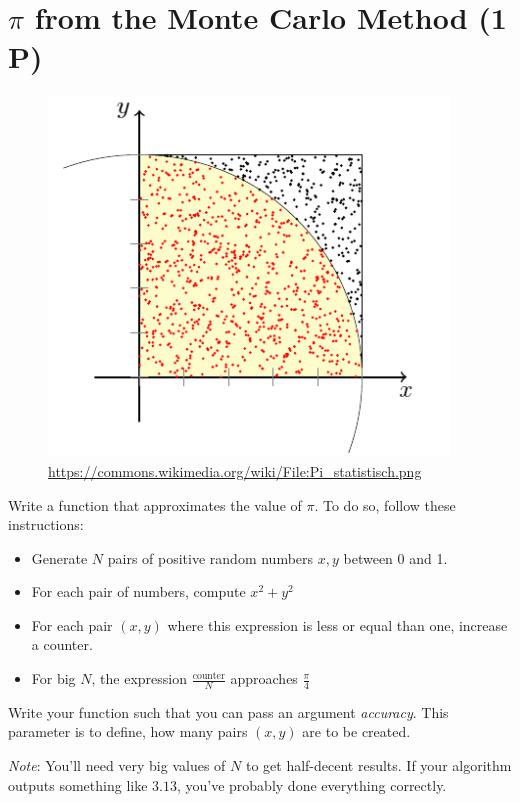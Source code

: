 \documentclass[
	english,
	fontsize=10pt,
	parskip=half,
	titlepage=true,
	DIV=12
]{scrartcl}
\begin{document}
\section{$\pi$ from the Monte Carlo Method (1 P)}
\begin{figure}
\vspace{-20pt}
\includegraphics[width=\linewidth]{MCarlo}
\caption{\url{https://commons.wikimedia.org/wiki/File:Pi_statistisch.png}}
\label{fig:MCPI}
\vspace{-80pt}
\end{figure}
%
Write a function that approximates the value of $\pi$. To do so, follow these instructions:
\begin{itemize}
\item Generate $N$ pairs of positive random numbers $x, y$ between 0 and 1.
\item For each pair of numbers, compute $x^2 + y^2$
\item For each pair $(x, y)$ where this expression is less or equal than one, increase a counter.
\item For big $N$, the expression $\frac{\text{counter}}{N}$ approaches $\frac{\pi}{4}$
\end{itemize}

Write your function such that you can pass an argument \emph{accuracy}. This parameter is to define, how many pairs $(x, y)$ are to be created.

\emph{Note}: You'll need very big values of $N$ to get half-decent results. If your algorithm outputs something like $3.13$, you've probably done everything correctly.
\end{document}

